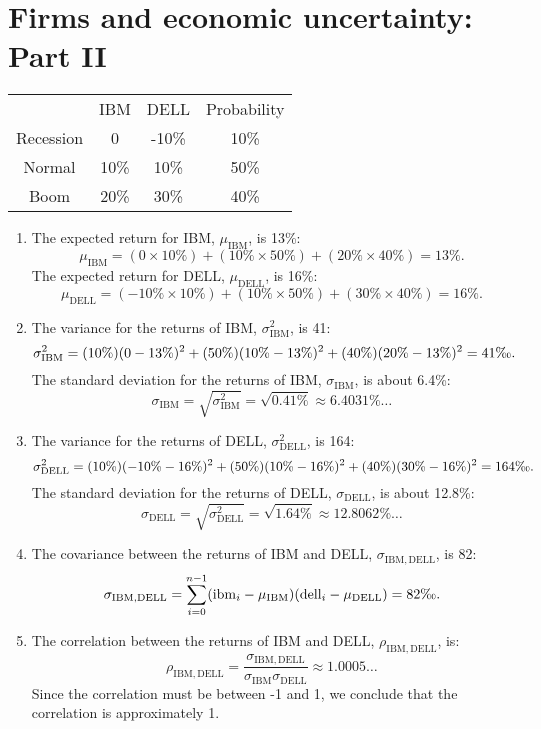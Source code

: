 \documentclass[12pt]{article}
\begin{document}
\section{Firms and economic uncertainty: Part II}
\begin{center}\begin{tabular}{c||c|c|c}
&IBM&DELL&Probability\\
Recession&0&-10\%&10\%\\
Normal&10\%&10\%&50\%\\
Boom&20\%&30\%&40\%
\end{tabular}\end{center}
\begin{enumerate}
    \item The expected return for IBM, $\mu_{\mathrm{IBM}}$, is 13\%:
    \[\mu_{\mathrm{IBM}}=(0\times 10\%)+(10\%\times 50\%)+(20\%\times 40\%)=13\%.\]
    The expected return for DELL, $\mu_{\mathrm{DELL}}$, is 16\%:
    \[\mu_{\mathrm{DELL}}=(-10\%\times 10\%)+(10\%\times 50\%)+(30\%\times 40\%)=16\%.\]
    \item The variance for the returns of IBM, $\sigma^2_{\mathrm{IBM}}$, is 41\textperthousand:
    \[\sigma^2_{\mathrm{IBM}}=(10\%)(0-13\%)^2+(50\%)(10\%-13\%)^2+(40\%)(20\%-13\%)^2=41\text{\textperthousand}.\]
    The standard deviation for the returns of IBM, $\sigma_{\mathrm{IBM}}$, is about 6.4\%:
    \[\sigma_{\mathrm{IBM}}=\sqrt{\sigma^2_{\mathrm{IBM}}}=\sqrt{0.41\%}\approx 6.4031\%\dots\]
    \item The variance for the returns of DELL, $\sigma^2_{\mathrm{DELL}}$, is 164\textperthousand:
    \[\sigma^2_{\mathrm{DELL}}=(10\%)(-10\%-16\%)^2+(50\%)(10\%-16\%)^2+(40\%)(30\%-16\%)^2=164\text{\textperthousand}.\]
    The standard deviation for the returns of DELL, $\sigma_{\mathrm{DELL}}$, is about 12.8\%:
    \[\sigma_{\mathrm{DELL}}=\sqrt{\sigma^2_{\mathrm{DELL}}}=\sqrt{1.64\%}\approx 12.8062\%\dots\]
    \item The covariance between the returns of IBM and DELL, $\sigma_{\mathrm{IBM},\mathrm{DELL}}$, is 82\textperthousand:
    \[\sigma_{\mathrm{IBM},\mathrm{DELL}}=\sum_{i=0}^{n-1}(\mathrm{ibm}_i-\mu_{\mathrm{IBM}})(\mathrm{dell}_i-\mu_{\mathrm{DELL}})=82\text{\textperthousand}.\]
    \item The correlation between the returns of IBM and DELL, $\rho_{\mathrm{IBM},\mathrm{DELL}}$, is:
    \[\rho_{\mathrm{IBM},\mathrm{DELL}}=\frac{\sigma_{\mathrm{IBM},\mathrm{DELL}}}{\sigma_{\mathrm{IBM}}\sigma_{\mathrm{DELL}}}\approx 1.0005\dots\]
    Since the correlation must be between -1 and 1, we conclude that the correlation is approximately 1.
\end{enumerate}
\end{document}
